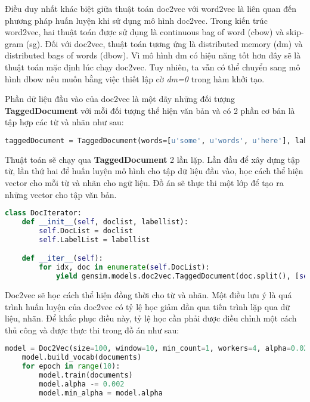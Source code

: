 Điều duy nhất khác biệt giữa thuật toán doc2vec với word2vec là liên quan đến phương pháp huấn luyện khi sử dụng mô hình doc2vec.
Trong kiến trúc word2vec, hai thuật toán được sử dụng là continuous bag of word (cbow) và skip-gram (sg).
Đối với doc2vec, thuật toán tương ứng là distributed memory (dm) và distributed bags of words (dbow).
Vì mô hình dm có hiệu năng tốt hơn đây sẽ là thuật toán mặc định lúc chạy doc2vec.
Tuy nhiên, ta vẫn có thể chuyển sang mô hình dbow nếu muốn bằng việc thiết lập cờ \textit{dm=0} trong hàm khởi tạo.

Phần dữ liệu đầu vào của doc2vec là một dãy những đối tượng \textbf{TaggedDocument} với mỗi đối tượng thể hiện văn bản và có 2 phần cơ bản là tập hợp các từ và nhãn như sau:
\begin{lstlisting}[language=Python]
taggedDocument = TaggedDocument(words=[u'some', u'words', u'here'], labels=[u'SENT_1'])
\end{lstlisting}

Thuật toán sẽ chạy qua \textbf{TaggedDocument} 2 lần lặp.
Lần đầu để xây dựng tập từ, lần thứ hai để huấn luyện mô hình cho tập dữ liệu đầu vào, học cách thể hiện vector cho mỗi từ và nhãn cho ngữ liệu.
Đồ án sẽ thực thi một lớp để tạo ra những vector cho tập văn bản.
\begin{lstlisting}[language=Python]
class DocIterator:
    def __init__(self, doclist, labellist):
        self.DocList = doclist
        self.LabelList = labellist

    def __iter__(self):
        for idx, doc in enumerate(self.DocList):
            yield gensim.models.doc2vec.TaggedDocument(doc.split(), [self.LabelList[idx]])
\end{lstlisting}

Doc2vec sẽ học cách thể hiện đồng thời cho từ và nhãn.
Một điều lưu ý là quá trình huấn luyện của doc2vec có tỷ lệ học giảm dần qua tiến trình lặp qua dữ liệu, nhãn.
Để khắc phục điều này, tỷ lệ học cần phải được điều chỉnh một cách thủ công và được thực thi trong đồ án như sau:
\label{code:training}
\begin{lstlisting}[language=Python]
model = Doc2Vec(size=100, window=10, min_count=1, workers=4, alpha=0.025, min_alpha=0.025)
    model.build_vocab(documents)
    for epoch in range(10):
        model.train(documents)
        model.alpha -= 0.002
        model.min_alpha = model.alpha
\end{lstlisting}

